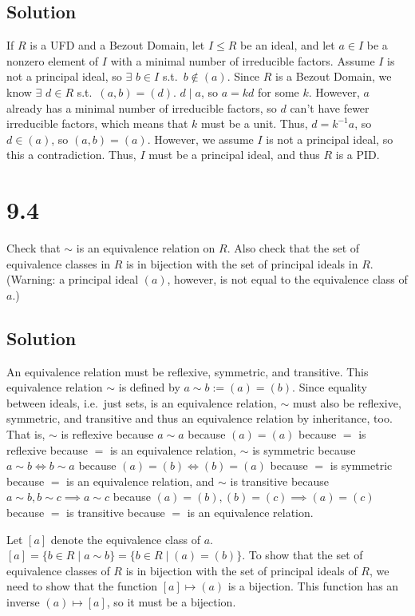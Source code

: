 \documentclass[fleqn]{article}
\begin{document}
        \subsection{Solution}
        If $R$ is a UFD and a Bezout Domain, let $I \leq R$ be an ideal, and let $a \in I$ be a nonzero element of $I$ with a minimal number of irreducible factors.  Assume $I$ is not a principal ideal, so $\exists$ $b \in I$ s.t.\ $b \notin (a)$.  Since $R$ is a Bezout Domain, we know $\exists$ $d \in R$ s.t.\ $(a, b) = (d)$.  $d \mid a$, so $a = kd$ for some $k$.  However, $a$ already has a minimal number of irreducible factors, so $d$ can't have fewer irreducible factors, which means that $k$ must be a unit.  Thus, $d = k^{-1} a$, so $d \in (a)$, so $(a, b) = (a)$.  However, we assume $I$ is not a principal ideal, so this a contradiction.  Thus, $I$ must be a principal ideal, and thus $R$ is a PID.
    
    \section{9.4}
    Check that $\sim$ is an equivalence relation on $R$.  Also check that the set of equivalence classes in $R$ is in bijection with the set of principal ideals in $R$.  (Warning: a principal ideal $(a)$, however, is not equal to the equivalence class of $a$.)
        
        \subsection{Solution}
        An equivalence relation must be reflexive, symmetric, and transitive.  This equivalence relation $\sim$ is defined by $a \sim b := (a) = (b)$.  Since equality between ideals, i.e.\ just sets, is an equivalence relation, $\sim$ must also be reflexive, symmetric, and transitive and thus an equivalence relation by inheritance, too.  That is, $\sim$ is reflexive because $a \sim a$ because $(a) = (a)$ because $=$ is reflexive because $=$ is an equivalence relation, $\sim$ is symmetric because $a \sim b \iff b \sim a$ because $(a) = (b) \iff (b) = (a)$ because $=$ is symmetric because $=$ is an equivalence relation, and $\sim$ is transitive because $a \sim b, b \sim c \implies a \sim c$ because $(a) = (b), (b) = (c) \implies (a) = (c)$ because $=$ is transitive because $=$ is an equivalence relation.
        
        Let $[a]$ denote the equivalence class of $a$.  $[a] = \{b \in R \mid a \sim b\} = \{b \in R \mid (a) = (b)\}$.  To show that the set of equivalence classes of $R$ is in bijection with the set of principal ideals of $R$, we need to show that the function $[a] \mapsto (a)$ is a bijection.  This function has an inverse $(a) \mapsto [a]$, so it must be a bijection.  
    
\end{document}
